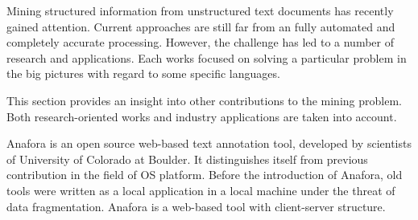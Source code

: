 
Mining structured information from unstructured text documents has recently gained attention. Current approaches are still 
far from an fully automated and completely accurate processing. However, the challenge has led to a number of research and 
applications. Each works focused on solving a particular problem in the big pictures with regard to some specific languages. 

This section provides an insight into other contributions to the mining problem. Both research-oriented works and 
industry applications are taken into account.


Anafora is an open source web-based text annotation tool, developed by scientists of  University of Colorado at Boulder. It 
distinguishes itself from previous contribution in the field of OS platform. Before the introduction of Anafora, old tools 
were written as a local application in a local machine under the threat of data fragmentation. Anafora is a web-based tool 
with client-server structure. %



